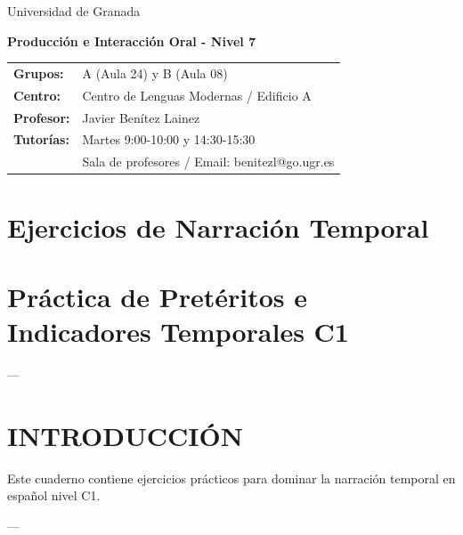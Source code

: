 \documentclass[a4paper,11pt]{article}
\begin{document}
\begin{center}
\small{Universidad de Granada}

\vspace{0.3cm}

\textbf{\large{Producción e Interacción Oral - Nivel 7}}

\vspace{0.4cm}

\small
\begin{tabular}{@{}ll@{}}
\textbf{Grupos:} & A (Aula 24) y B (Aula 08) \\
\textbf{Centro:} & Centro de Lenguas Modernas / Edificio A \\
\textbf{Profesor:} & Javier Benítez Lainez \\
\textbf{Tutorías:} & Martes 9:00-10:00 y 14:30-15:30 \\
& Sala de profesores / Email: benitezl@go.ugr.es
\end{tabular}
\end{center}

\vspace{0.5cm}
\section*{Ejercicios de Narración Temporal}

\vspace{0.4cm}

\section{Práctica de Pretéritos e Indicadores Temporales C1}

\vspace{0.2cm}

---

\vspace{0.2cm}

\section{INTRODUCCIÓN}

\vspace{0.2cm}

Este cuaderno contiene ejercicios prácticos para dominar la narración temporal en español nivel C1.

\vspace{0.2cm}

---

\vspace{0.2cm}
\end{document}
